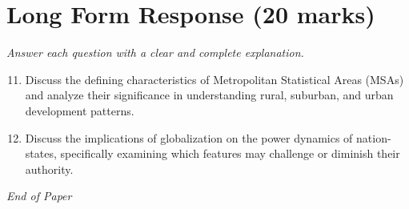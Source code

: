\documentclass[12pt]{article}
\begin{document}
\section*{Long Form Response (20 marks)}
\textit{Answer each question with a clear and complete explanation.}
\begin{enumerate}[label=\arabic*.]
\setcounter{enumi}{10}
\item Discuss the defining characteristics of Metropolitan Statistical Areas (MSAs) and analyze their significance in understanding rural, suburban, and urban development patterns.
\item Discuss the implications of globalization on the power dynamics of nation-states, specifically examining which features may challenge or diminish their authority.
\end{enumerate}

\vfill
\noindent\textit{End of Paper}
\end{document}
